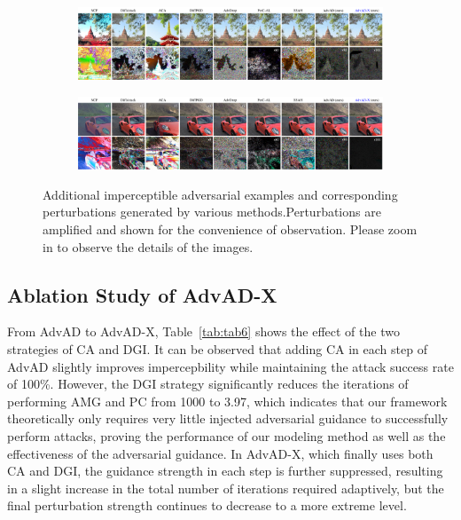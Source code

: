 \documentclass{article}
\begin{document}
\begin{figure}[htbp]
\begin{subfigure}
    \centering
    \includegraphics[width=1\textwidth]{figures/app_vis_new_5.pdf}
    \label{fig:subfig5}
    \vspace{-0.5cm}
\end{subfigure}
\begin{subfigure}
    \centering
    \includegraphics[width=1\textwidth]{figures/app_vis_new_6.pdf}
    \label{fig:subfig6}
    \vspace{-0.5cm}
\end{subfigure}
\caption{Additional imperceptible adversarial examples and corresponding perturbations generated by various methods.Perturbations are amplified and shown for the convenience of observation. Please zoom in to observe the details of the images.}
\label{fig:supp}
\end{figure}



\subsection{Ablation Study of AdvAD-X}  \label{app:C3}

From AdvAD to AdvAD-X, Table~\ref{tab:tab6} shows the effect of the two strategies of CA and DGI. It can be observed that adding CA in each step of AdvAD slightly improves impercepbility while maintaining the attack success rate of 100\%. However, the DGI strategy significantly reduces the iterations of performing AMG and PC from 1000 to 3.97, which indicates that our framework theoretically only requires very little injected  adversarial guidance to successfully perform attacks, proving the performance of our modeling method as well as the effectiveness of the adversarial guidance. In AdvAD-X, which finally uses both CA and DGI, the guidance strength in each step is further suppressed, resulting in a slight increase in the total number of iterations required adaptively, but the final perturbation strength continues to decrease to a more extreme level.
\end{document}
